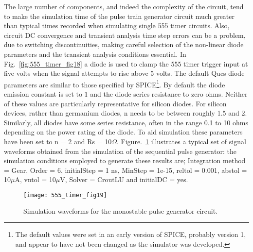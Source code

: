 The large number of components, and indeed the complexity of the circuit, tend to make the simulation time of the pulse train generator circuit much greater than typical times recorded when simulating single 555 timer circuits.  Also, circuit DC convergence and transient analysis time step errors can be a problem, due to switching discontinuities, making careful selection of the non-linear diode parameters and the transient analysis conditions essential. In Fig.~\ref{fig:555_timer_fig18} a diode is used to clamp the 555 timer trigger input at five volts when the signal attempts to rise above 5 volts. The default Qucs diode parameters are similar to those specified by SPICE\footnote{The default values were set in an early version of SPICE, probably version 1, and appear to have not been changed as the simulator was developed.}.  By default the diode emission constant is set to 1 and the diode series resistance to zero ohms. Neither of these values are particularly representative for silicon diodes. For silicon devices, rather than germanium diodes, n needs to be between roughly 1.5 and 2.  Similarly, all diodes have some series resistance, often in the range 0.1 to 10 ohms depending on the power rating of the diode. To aid simulation these parameters have been set to n = 2 and Rs = 10$\Omega$. Figure.~\ref{fig:555_timer_fig19} illustrates a typical set of signal waveforms obtained from the simulation of the sequential pulse generator: the simulation conditions employed to generate these results are; Integration method = Gear, Order = 6, initialStep = 1 ns, MinStep = 1e-15, reltol = 0.001, abstol = 10$\mu$A, vntol = 10$\mu$V, Solver = CroutLU and initialDC = yes.

\FloatBarrier 
\begin{figure}[ht]
  \centering
  \texttt{[image: 555\_timer\_fig19]}
  \caption{Simulation waveforms for the monostable pulse generator circuit.} 
  \label{fig:555_timer_fig19} 
\end{figure} 
\FloatBarrier


